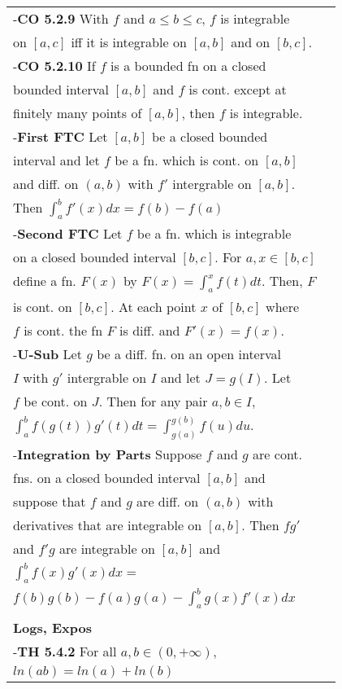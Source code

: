 \documentclass[10 pt,landscape]{article}
\begin{document}
\begin{multicols}{4}
\begin{tabular}{@{}ll@{}}
-\textbf{CO 5.2.9} With $f$ and $a \leq b \leq c$, $f$ is integrable\\ on $[a,c]$ iff it is integrable on $[a,b]$ and on $[b,c]$.\\
-\textbf{CO 5.2.10} If $f$ is a bounded fn on a closed\\bounded interval $[a,b]$ and $f$ is cont. except at \\finitely many points of $[a,b]$, then $f$ is integrable.\\
-\textbf{First FTC} Let $[a,b]$ be a closed bounded \\interval and let $f$ be a fn. which is cont. on $[a,b]$ \\ and diff. on $(a,b)$ with $f'$ intergrable on $[a,b]$. \\Then $\int_{a}^{b}f'(x)dx=f(b)-f(a)$\\
-\textbf{Second FTC} Let $f$ be a fn. which is integrable\\ on a closed bounded interval $[b,c]$. For $a,x \in [b,c]$\\ define a fn. $F(x)$ by $F(x)=\int_{a}^{x}f(t)dt$. Then,  $F$ \\is cont. on $[b,c]$. At each point $x$ of $[b,c]$ where\\ $f$ is cont. the fn $F$ is diff. and $F'(x)=f(x)$.\\
-\textbf{U-Sub} Let $g$ be a diff. fn. on an open interval \\$I$ with $g'$ intergrable on $I$ and let $J=g(I)$. Let \\$f$ be cont. on $J$. Then for any pair $a,b \in I$, \\ $\int_{a}^{b}f(g(t))g'(t)dt=\int_{g(a)}^{g(b)}f(u)du$.\\
-\textbf{Integration by Parts} Suppose $f$ and $g$ are cont. \\fns. on a closed bounded interval $[a,b]$ and \\suppose that $f$ and $g$ are diff. on $(a,b)$ with\\ derivatives that are integrable on $[a,b]$. Then $fg'$ \\and $f'g$ are integrable on $[a,b]$ and \\ $\int_{a}^{b}f(x) g'(x)dx=$\\$f(b)g(b)-f(a)g(a)-\int_{a}^{b}g(x)f'(x)dx$\\
\\
\textbf{Logs, Expos}\\
-\textbf{TH 5.4.2} For all $a,b \in (0, +\infty)$,\\ $ln(ab)=ln(a) +ln(b)$\\

\end{tabular}
\end{multicols}
\end{document}
